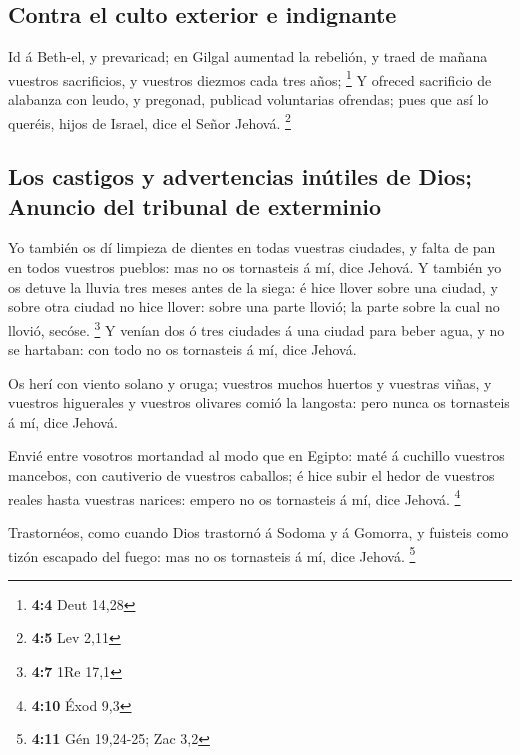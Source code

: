 \hypertarget{contra-el-culto-exterior-e-indignante}{%
\subsection{Contra el culto exterior e
indignante}\label{contra-el-culto-exterior-e-indignante}}

 Id á Beth-el, y prevaricad; en Gilgal aumentad la rebelión,
y traed de mañana vuestros sacrificios, y vuestros diezmos cada tres
años; \footnote{\textbf{4:4} Deut 14,28}  Y ofreced
sacrificio de alabanza con leudo, y pregonad, publicad voluntarias
ofrendas; pues que así lo queréis, hijos de Israel, dice el Señor
Jehová. \footnote{\textbf{4:5} Lev 2,11}

\hypertarget{los-castigos-y-advertencias-inuxfatiles-de-dios-anuncio-del-tribunal-de-exterminio}{%
\subsection{Los castigos y advertencias inútiles de Dios; Anuncio del
tribunal de
exterminio}\label{los-castigos-y-advertencias-inuxfatiles-de-dios-anuncio-del-tribunal-de-exterminio}}

 Yo también os dí limpieza de dientes en todas vuestras
ciudades, y falta de pan en todos vuestros pueblos: mas no os tornasteis
á mí, dice Jehová.  Y también yo os detuve la lluvia tres
meses antes de la siega: é hice llover sobre una ciudad, y sobre otra
ciudad no hice llover: sobre una parte llovió; la parte sobre la cual no
llovió, secóse. \footnote{\textbf{4:7} 1Re 17,1}  Y venían
dos ó tres ciudades á una ciudad para beber agua, y no se hartaban: con
todo no os tornasteis á mí, dice Jehová.

 Os herí con viento solano y oruga; vuestros muchos huertos
y vuestras viñas, y vuestros higuerales y vuestros olivares comió la
langosta: pero nunca os tornasteis á mí, dice Jehová.

 Envié entre vosotros mortandad al modo que en Egipto: maté
á cuchillo vuestros mancebos, con cautiverio de vuestros caballos; é
hice subir el hedor de vuestros reales hasta vuestras narices: empero no
os tornasteis á mí, dice Jehová. \footnote{\textbf{4:10} Éxod 9,3}

 Trastornéos, como cuando Dios trastornó á Sodoma y á
Gomorra, y fuisteis como tizón escapado del fuego: mas no os tornasteis
á mí, dice Jehová. \footnote{\textbf{4:11} Gén 19,24-25; Zac 3,2}

